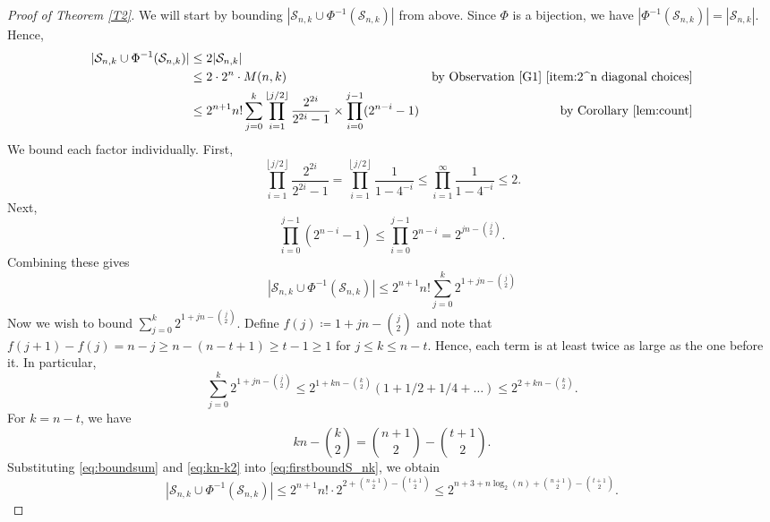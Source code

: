 \documentclass[10pt,a4paper]{amsart}
\numberwithin{equation}{section}
\theoremstyle{plain}
\theoremstyle{remark}
\theoremstyle{definition}
\begin{document}
\begin{proof}[Proof of Theorem \ref{T2}]
    We will start by bounding $ |{{\mathcal{S}_{n, k} \cup \Phi^{-1}(\mathcal{S}_{n, k})}}|$ from above. Since $\Phi$ is a bijection, we have $|\Phi^{-1}(\mathcal{S}_{n, k})| = |\mathcal{S}_{n, k} |$. 
    Hence,
    \begin{align*}
        |{\mathcal{S}_{n, k} \cup \Phi^{-1}(\mathcal{S}_{n, k})} | &\leq 2|\mathcal{S}_{n,k}| 
        \\ &\le  2\cdot 2^n \cdot M(n,k) & \text{by Observation \ref{G1} \eqref{item:2^n diagonal choices}}
        \\ &\le 2^{n+1} n!  \sum_{j=0}^{k} \prod_{i=1}^{\left \lfloor{j/2}\right \rfloor } \frac{2^{2i}}{2^{2i}-1} \times \prod_{i=0}^{j-1} (2^{n-i}-1) & \text{by Corollary \ref{lem:count}}
    \end{align*}
    We bound each factor individually. First,
    \begin{equation*}
        \prod_{i=1}^{\left \lfloor{j/2}\right \rfloor } \frac{2^{2i}}{2^{2i}-1} = \prod_{i=1}^{\left \lfloor{j/2}\right \rfloor }\frac{1}{1-4^{-i}} \le  \prod_{i=1}^{\infty}\frac{1}{1-4^{-i}} \leq 2.
    \end{equation*}
    Next,
    \begin{equation*}
        \prod_{i=0}^{j-1} (2^{n-i}-1) \leq \prod_{i=0}^{j-1} 2^{n-i} = 2^{jn - \binom{j}{2}}.
    \end{equation*}
    Combining these gives
    \begin{equation}\label{eq:firstboundS_nk}
        |{\mathcal{S}_{n, k} \cup \Phi^{-1}(\mathcal{S}_{n, k})} | \leq 2^{n+1} n! \sum_{j=0}^{k} 2^{1+jn - \binom{j}{2}}  
    \end{equation}
     Now we wish to bound $ \sum_{j=0}^{k} 2^{1+jn - \binom{j}{2}}$.
    Define $f(j) \coloneqq 1+jn- \binom{j}{2}$ and note that $f(j+1) - f(j) = n-j \geq n-(n-t+1) \geq t-1 \geq 1$ for $j \le k \le n-t$. Hence, each term is at least twice as large as the one before it. In particular,
    \begin{equation}\label{eq:boundsum}
        \sum_{j=0}^{k} 2^{1+jn - \binom{j}{2}} \leq 2^{1+kn - \binom{k}{2}}(1+ 1/2 + 1/4 + \dots) \leq 2^{2+kn - \binom{k}{2}}.
    \end{equation}
    For $k = n-t$, we have
    \begin{equation}\label{eq:kn-k2}
        kn-\binom{k}{2} = \binom{n+1}{2} - \binom{t+1}{2}.
    \end{equation}
    Substituting \eqref{eq:boundsum} and \eqref{eq:kn-k2} into \eqref{eq:firstboundS_nk}, we obtain
    \begin{equation*}
         |{\mathcal{S}_{n, k} \cup \Phi^{-1}(\mathcal{S}_{n, k})} | \leq 2^{n+1} n! \cdot 2^{2 + \binom{n+1}{2} - \binom{t+1}{2}} \leq  2^{n+3 +n\log_2(n) + \binom{n+1}{2}-\binom{t+1}{2}}.
    \end{equation*}
   

\end{proof}
\end{document}
